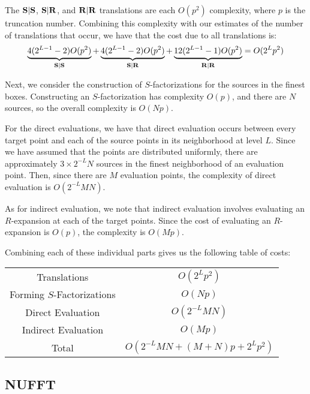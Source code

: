 The $\bold{S}|\bold{S}$, $\bold{S}|\bold{R}$, and $\bold{R}|\bold{R}$ translations are each $O(p^2)$
complexity, where $p$ is the truncation number. Combining this
complexity with our estimates of the number of translations that
occur, we have that the cost due to all translations is:
\begin{align*}
  \underbrace{4(2^{L-1} - 2) O(p^2)}_{\bold{S}|\bold{S}} + \underbrace{4(2^{L-1} - 2) O(p^2)}_{\bold{S}|\bold{R}} + \underbrace{12(2^{L-1} - 1) O(p^2)}_{\bold{R}|\bold{R}} = O(2^Lp^2)
\end{align*}

Next, we consider the construction of $S$-factorizations for the
sources in the finest boxes. Constructing an $S$-factorization has
complexity $O(p)$, and there are $N$ sources, so the overall
complexity is $O(Np)$.

For the direct evaluations, we have that direct evaluation occurs
between every target point and each of the source points in its
neighborhood at level $L$. Since we have assumed that the points are
distributed uniformly, there are approximately
$3 \times 2^{-L} N$ sources in the finest neighborhood of an
evaluation point. Then, since there are $M$ evaluation points, the
complexity of direct evaluation is $O(2^{-L}MN)$. 

As for indirect evaluation, we note that indirect evaluation involves
evaluating an $R$-expansion at each of the target points. Since the
cost of evaluating an $R$-expansion is $O(p)$, the complexity is
$O(Mp)$.

Combining each of these individual parts gives us the following table
of costs:
\begin{center}
  \begin{tabular}{|c|c|}
    \hline
    Translations & $O(2^Lp^2)$ \\
    Forming $S$-Factorizations & $O(Np)$ \\
    Direct Evaluation & $O(2^{-L}MN)$ \\
    Indirect Evaluation & $O(Mp)$ \\
    \hline
    Total & $O(2^{-L}MN + (M + N)p + 2^Lp^2)$ \\
    \hline
  \end{tabular}
\end{center}

\subsection{NUFFT}

